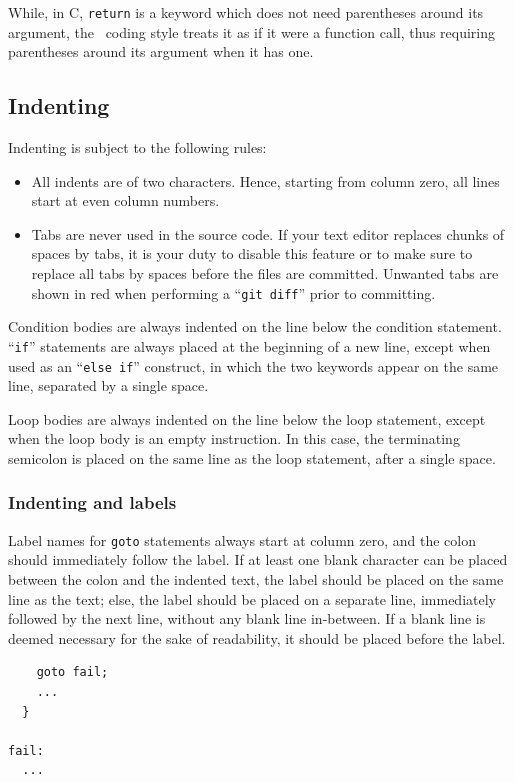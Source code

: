 While, in C, \texttt{return} is a keyword which does not need
parentheses around its argument, the \scotch\ coding style treats it
as if it were a function call, thus requiring parentheses around its
argument when it has one.

\subsection{Indenting}

Indenting is subject to the following rules:
\begin{itemize}
\item
  All indents are of two characters. Hence, starting from column zero,
  all lines start at even column numbers.
\item
  Tabs are never used in the source code. If your text editor replaces
  chunks of spaces by tabs, it is your duty to disable this feature or
  to make sure to replace all tabs by spaces before the files are
  committed. Unwanted tabs are shown in red when performing a
  ``\texttt{git diff}'' prior to committing.
\end{itemize}

Condition bodies are always indented on the line below the condition
statement. ``\texttt{if}'' statements are always placed at the beginning
of a new line, except when used as an ``\texttt{else~if}''
construct, in which the two keywords appear on the same line,
separated by a single space.

Loop bodies are always indented on the line below the loop statement,
except when the loop body is an empty instruction. In this case, the
terminating semicolon is placed on the same line as the loop
statement, after a single space.

\subsubsection{Indenting and labels}

Label names for \texttt{goto} statements always start at column zero,
and the colon should immediately follow the label. If at least one
blank character can be placed between the colon and the indented text,
the label should be placed on the same line as the text; else, the
label should be placed on a separate line, immediately followed by the
next line, without any blank line in-between. If a blank line is
deemed necessary for the sake of readability, it should be placed
before the label.
\begin{lstlisting}
    goto fail;
    ...
  }

fail:
  ...
\end{lstlisting}

